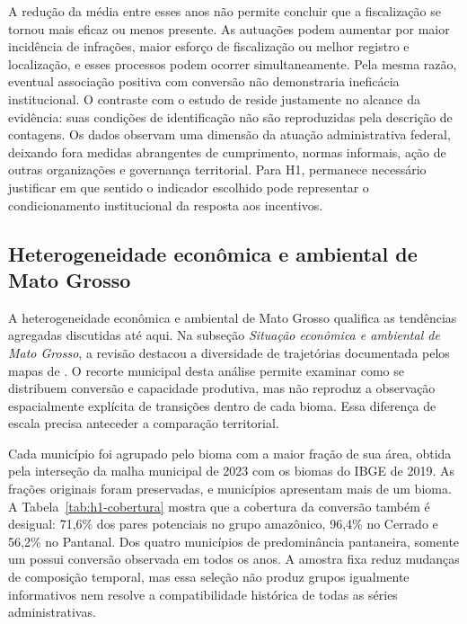 A redução da média entre esses anos não permite concluir que a fiscalização se tornou mais eficaz ou menos presente. As autuações podem aumentar por maior incidência de infrações, maior esforço de fiscalização ou melhor registro e localização, e esses processos podem ocorrer simultaneamente. Pela mesma razão, eventual associação positiva com conversão não demonstraria ineficácia institucional. O contraste com o estudo de  reside justamente no alcance da evidência: suas condições de identificação não são reproduzidas pela descrição de contagens. Os dados observam uma dimensão da atuação administrativa federal, deixando fora medidas abrangentes de cumprimento, normas informais, ação de outras organizações e governança territorial. Para H1, permanece necessário justificar em que sentido o indicador escolhido pode representar o condicionamento institucional da resposta aos incentivos.

\FloatBarrier
\subsection{Heterogeneidade econômica e ambiental de Mato Grosso}
\label{subsec:mt-heterogeneidade}

A heterogeneidade econômica e ambiental de Mato Grosso qualifica as tendências agregadas discutidas até aqui. Na subseção \emph{Situação econômica e ambiental de Mato Grosso}, a revisão destacou a diversidade de trajetórias documentada pelos mapas de . O recorte municipal desta análise permite examinar como se distribuem conversão e capacidade produtiva, mas não reproduz a observação espacialmente explícita de transições dentro de cada bioma. Essa diferença de escala precisa anteceder a comparação territorial.

Cada município foi agrupado pelo bioma com a maior fração de sua área, obtida pela interseção da malha municipal de 2023 com os biomas do IBGE de 2019. As frações originais foram preservadas, e \Hmixed{} municípios apresentam mais de um bioma. A Tabela~\ref{tab:h1-cobertura} mostra que a cobertura da conversão também é desigual: 71,6\% dos pares potenciais no grupo amazônico, 96,4\% no Cerrado e 56,2\% no Pantanal. Dos quatro municípios de predominância pantaneira, somente um possui conversão observada em todos os anos. A amostra fixa reduz mudanças de composição temporal, mas essa seleção não produz grupos igualmente informativos nem resolve a compatibilidade histórica de todas as séries administrativas.

